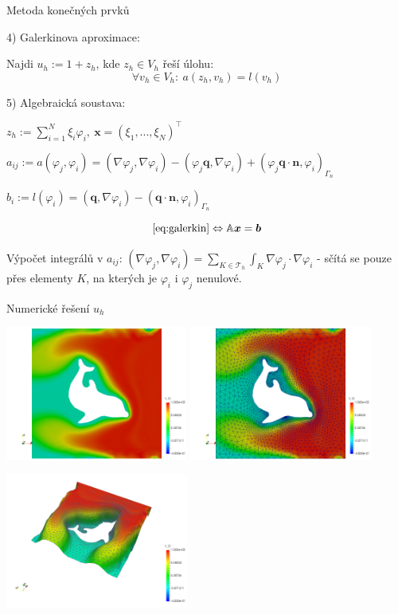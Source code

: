 \documentclass{beamer}
\newcommand{\Th}{\mathcal T_h}
\newcommand{\vc}[1]{\boldsymbol{#1}}
\begin{document}
\begin{frame}{Metoda konečných prvků}

4) Galerkinova aproximace:

Najdi $u_h:=1+z_h$, kde $z_h\in V_h$ řeší úlohu:
\begin{equation}\label{eq:galerkin}
\forall v_h\in V_h:~ a(z_h,v_h)=l(v_h)
\end{equation}
\bigskip

5) Algebraická soustava:\medskip

$ z_h := \sum_{i=1}^N\xi_i\varphi_i,~\vc x=(\xi_1,...,\xi_N)^\top $\medskip

$a_{ij} := a(\varphi_j,\varphi_i) = (\nabla \varphi_j,\nabla\varphi_i) - (\varphi_j\vc q,\nabla\varphi_i) + (\varphi_j\vc q\cdot\vc n,\varphi_i)_{\Gamma_n}$\medskip

$b_i := l(\varphi_i) = (\vc q,\nabla\varphi_i) - (\vc q\cdot\vc n,\varphi_i)_{\Gamma_n}$

\[ \eqref{eq:galerkin} \Leftrightarrow \mathbb A\vc x = \vc b\]

Výpočet integrálů v $a_{ij}$: $(\nabla\varphi_j,\nabla\varphi_i)=\sum_{K\in\Th}\int_K\nabla\varphi_j\cdot\nabla\varphi_i$ - sčítá se pouze přes elementy $K$, na kterých je $\varphi_i$ i $\varphi_j$ nenulové.

\end{frame}


\begin{frame}{Numerické řešení $u_h$}

\includegraphics[width=6cm]{temp}
\includegraphics[width=6cm]{temp_mesh}

\includegraphics[width=6cm]{temp_3d}

\end{frame}
\end{document}
